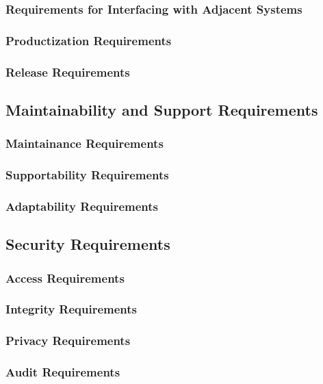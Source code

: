 \documentclass[12pt, titlepage]{article}
\begin{document}
    \subsubsection{Requirements for Interfacing with Adjacent Systems}
    \subsubsection{Productization Requirements}
    \subsubsection{Release Requirements}

  \subsection{Maintainability and Support Requirements}

    \subsubsection{Maintainance Requirements}
    \subsubsection{Supportability Requirements}
    \subsubsection{Adaptability Requirements}

  \subsection{Security Requirements}

    \subsubsection{Access Requirements}
    \subsubsection{Integrity Requirements}
    \subsubsection{Privacy Requirements}
    \subsubsection{Audit Requirements}
\end{document}
